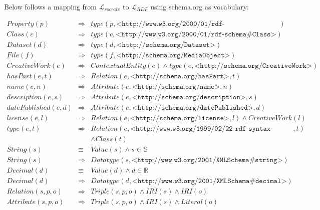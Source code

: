 Below follows a mapping from $\mathcal{L}_{rocrate}$ to $\mathcal{L}_{RDF}$ using schema.org as vocabulary:

\begin{eqnarray*}
Property(p)         & \Rightarrow &     type(p, \texttt{<http://www.w3.org/2000/01/rdf-schema#Property>})   \\
Class(c)            & \Rightarrow &     type(c, \texttt{<http://www.w3.org/2000/01/rdf-schema#Class>})  \\
Dataset(d)          & \Rightarrow &     type(d, \texttt{<http://schema.org/Dataset>})   \\
File(f)             & \Rightarrow &     type(f, \texttt{<http://schema.org/MediaObject>})   \\
CreativeWork(e)     & \Rightarrow &     ContextualEntity(e) \land type(e, \texttt{<http://schema.org/CreativeWork>})  \\
hasPart(e, t)       & \Rightarrow &     Relation(e, \texttt{<http://schema.org/hasPart>}, t)    \\
name(e, n)          & \Rightarrow &     Attribute(e, \texttt{<http://schema.org/name>}, n)  \\
description(e, s)   & \Rightarrow &     Attribute(e, \texttt{<http://schema.org/description>}, s)   \\
datePublished(e, d) & \Rightarrow &     Attribute(e, \texttt{<http://schema.org/datePublished>}, d) \\
license(e, l)       & \Rightarrow &     Relation(e, \texttt{<http://schema.org/license>}, l) \land CreativeWork(l) \\
type(e, t)          & \Rightarrow &     Relation(e, \texttt{<http://www.w3.org/1999/02/22-rdf-syntax-ns#type>}, t) \\
                    & & \land Class(t)   \\
String(s)           & \equiv &          Value(s) \land  s \in \mathbb{S} \\
String(s)           & \Rightarrow &     Datatype(s, \texttt{<http://www.w3.org/2001/XMLSchema#string>}) \\
Decimal(d)          & \equiv &          Value(d) \land  d \in \mathbb{R} \\
Decimal(d)          & \Rightarrow &     Datatype(d, \texttt{<http://www.w3.org/2001/XMLSchema#decimal>}) \\
Relation(s,p,o)     & \Rightarrow &     Triple(s,p,o) \land IRI(s) \land IRI(o) \\
Attribute(s,p,o)    & \Rightarrow &     Triple(s,p,o) \land IRI(s) \land Literal(o) \\
\end{eqnarray*}

